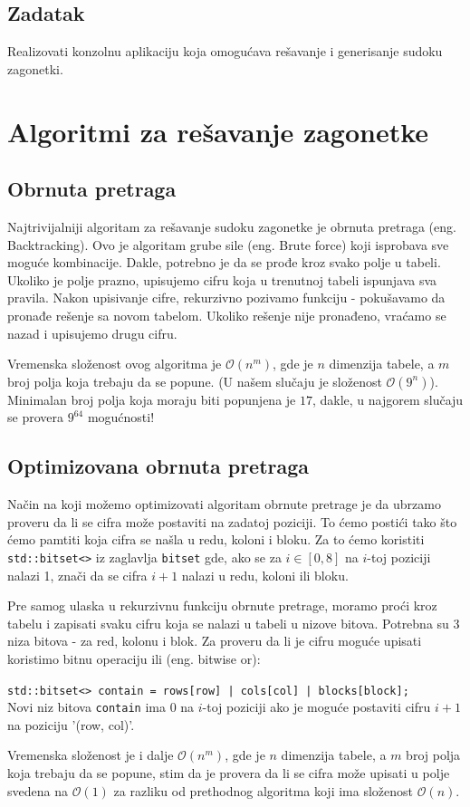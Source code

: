 \documentclass[a4paper]{article}
\begin{document}
    \subsection{Zadatak}
    Realizovati konzolnu aplikaciju koja omogućava rešavanje i generisanje sudoku zagonetki.    
    \newpage

    \section{Algoritmi za rešavanje zagonetke}
    
    \subsection{Obrnuta pretraga}
    Najtrivijalniji algoritam za rešavanje sudoku zagonetke je obrnuta pretraga (eng. Backtracking).
    Ovo je algoritam grube sile (eng. Brute force) koji isprobava sve moguće kombinacije. Dakle, potrebno je da se prođe kroz
    svako polje u tabeli. Ukoliko je polje prazno, upisujemo cifru koja u trenutnoj tabeli ispunjava sva pravila. Nakon upisivanje cifre, rekurzivno pozivamo funkciju 
    - pokušavamo da pronađe rešenje sa novom tabelom. Ukoliko rešenje nije pronađeno, vraćamo se nazad i upisujemo drugu cifru. 
    \par Vremenska složenost ovog algoritma je $\mathcal{O}(n ^ m)$, gde je $n$ dimenzija tabele, a $m$ broj polja koja trebaju da se popune.
    (U našem slučaju je složenost $\mathcal{O}(9^n)$). Minimalan broj polja koja
    moraju biti popunjena je $17$, dakle, u najgorem slučaju se provera $9^{64}$ mogućnosti!
    
    \subsection{Optimizovana obrnuta pretraga}
    Način na koji možemo optimizovati algoritam obrnute pretrage je da ubrzamo proveru da li se cifra može postaviti na zadatoj poziciji. To ćemo postići tako što ćemo pamtiti
    koja cifra se našla u redu, koloni i bloku. Za to ćemo koristiti \texttt{std::bitset<>} iz zaglavlja \texttt{bitset} gde, ako se za $i \in [0,8]$ na $i$-toj poziciji nalazi 1, znači da se cifra $i+1$ nalazi u redu, koloni ili bloku.
    \par Pre samog ulaska u rekurzivnu funkciju obrnute pretrage, moramo proći kroz tabelu i zapisati svaku cifru koja se nalazi u tabeli u nizove bitova. Potrebna su 3 niza bitova - 
    za red, kolonu i blok. Za proveru da li je cifru moguće upisati
    koristimo bitnu operaciju ili (eng. bitwise or): 
    \par\texttt{std::bitset<> contain = rows[row] | cols[col] | blocks[block];}\\
    Novi niz bitova \texttt{contain} ima $0$ na $i$-toj poziciji ako je moguće postaviti cifru $i+1$ na poziciju '(row, col)'.
    \par Vremenska složenost je i dalje $\mathcal{O}(n^m)$, gde je $n$ dimenzija tabele, a $m$ broj polja koja trebaju da se popune, stim da je provera da li se cifra može upisati 
    u polje svedena na $\mathcal{O}(1)$ za razliku od prethodnog algoritma koji ima složenost $\mathcal{O}(n)$.
\end{document}
